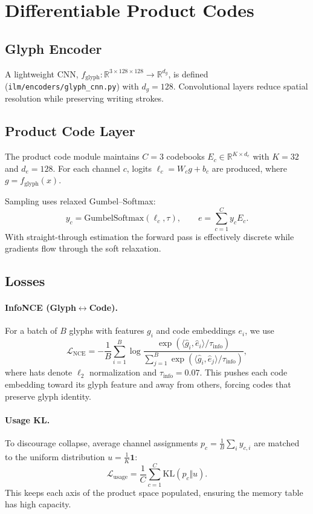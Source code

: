 \documentclass[11pt]{article}
\begin{document}
\section{Differentiable Product Codes}\label{sec:codes}
\subsection{Glyph Encoder}
A lightweight CNN, $f_{\text{glyph}}:\mathbb{R}^{3\times 128\times 128}\to\mathbb{R}^{d_g}$, is defined (\texttt{ilm/encoders/glyph\_cnn.py}) with $d_g=128$. Convolutional layers reduce spatial resolution while preserving writing strokes.

\subsection{Product Code Layer}
The product code module maintains $C=3$ codebooks $E_c\in\mathbb{R}^{K\times d_e}$ with $K=32$ and $d_e=128$. For each channel $c$, logits $\ell_c = W_c g + b_c$ are produced, where $g=f_{\text{glyph}}(x)$.

Sampling uses relaxed Gumbel--Softmax:
\begin{equation}
    y_c = \mathrm{GumbelSoftmax}(\ell_c, \tau), \qquad e = \sum_{c=1}^C y_c E_c.
\end{equation}
With straight-through estimation the forward pass is effectively discrete while gradients flow through the soft relaxation.

\subsection{Losses}
\paragraph{InfoNCE (Glyph$\leftrightarrow$Code).}
For a batch of $B$ glyphs with features $g_i$ and code embeddings $e_i$, we use
\begin{equation}
    \mathcal{L}_{\text{NCE}} = -\frac{1}{B}\sum_{i=1}^B \log \frac{\exp(\langle \hat{g}_i, \hat{e}_i\rangle/\tau_{\text{info}})}{\sum_{j=1}^B \exp(\langle \hat{g}_i, \hat{e}_j\rangle/\tau_{\text{info}})},
\end{equation}
where hats denote $\ell_2$ normalization and $\tau_{\text{info}}=0.07$. This pushes each code embedding toward its glyph feature and away from others, forcing codes that preserve glyph identity.

\paragraph{Usage KL.}
To discourage collapse, average channel assignments $p_c = \frac{1}{B}\sum_i y_{c,i}$ are matched to the uniform distribution $u = \frac{1}{K}\mathbf{1}$:
\begin{equation}
    \mathcal{L}_{\text{usage}} = \frac{1}{C}\sum_{c=1}^C \mathrm{KL}(p_c\Vert u).
\end{equation}
This keeps each axis of the product space populated, ensuring the memory table has high capacity.
\end{document}
